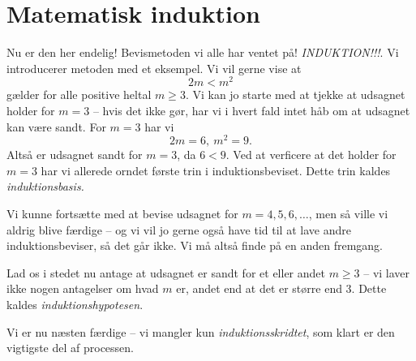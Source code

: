 \documentclass[a4paper, 12pt]{article}
\numberwithin{equation}{section}
\theoremstyle{plain}
\theoremstyle{definition}
\begin{document}
\section{Matematisk induktion}
Nu er den her endelig! Bevismetoden vi alle har ventet på! \emph{INDUKTION!!!}. Vi introducerer metoden med et eksempel. Vi vil gerne vise at 
\[
  2m<m^2
\]
gælder for alle positive heltal \(m\ge 3\). Vi kan jo starte med at tjekke at udsagnet holder for \(m=3\) -- hvis det ikke gør, har vi i hvert fald intet håb om at udsagnet kan være sandt. For \(m=3\) har vi
\[
  2m=6,\ m^2=9.
  \]
  Altså er udsagnet sandt for \(m=3\), da \(6<9\). Ved at verficere at det holder for \(m=3\) har vi allerede orndet første trin i induktionsbeviset. Dette trin kaldes \emph{induktionsbasis.}

  Vi kunne fortsætte med at bevise udsagnet for \(m=4,5,6,\ldots\), men så ville vi aldrig blive færdige -- og vi vil jo gerne også have tid til at lave andre induktionsbeviser, så det går ikke. Vi må altså finde på en anden fremgang.

  Lad os i stedet nu antage at udsagnet er sandt for et eller andet \(m\ge 3\) -- vi laver ikke nogen antagelser om hvad \(m\) er, andet end at det er større end 3. Dette kaldes \emph{induktionshypotesen}.

  Vi er nu næsten færdige -- vi mangler kun \emph{induktionsskridtet}, som klart er den vigtigste del af processen.
\end{document}
